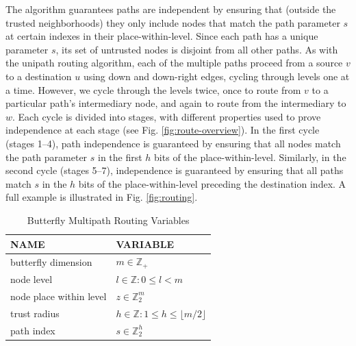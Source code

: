 \documentclass[10pt,letterpaper]{article}
\begin{document}
The algorithm guarantees paths are independent by ensuring that
(outside the trusted neighborhoods)
they only include
nodes that match the path parameter $s$ at certain indexes in their
place-within-level.
Since each path has a unique parameter $s$,
its set of untrusted nodes is disjoint from all other paths.
As with the unipath routing algorithm,
each of the multiple paths proceed from a source $v$ to a destination $u$
using down and down-right edges,
cycling through levels one at a time.
However, we cycle through the levels twice, once to route from $v$ to a
particular path's intermediary node,
and again to route from the intermediary to $w$.
Each cycle is divided into stages,
with different properties used to prove independence at each stage
(see Fig. \ref{fig:route-overview}).
In the first cycle (stages 1--4), path independence is guaranteed by ensuring that
all nodes match the path parameter $s$ in the first $h$ bits of the place-within-level.
Similarly, in the second cycle (stages 5--7),
independence is guaranteed by ensuring that all paths match $s$ in the
$h$ bits of the place-within-level preceding the destination index.
A full example is illustrated in Fig. \ref{fig:routing}.

\begin{table}[h!]
\caption{Butterfly Multipath Routing Variables\label{tab:routing}}
\begin{center}
\begin{tabular}{|l|l|}
\hline
NAME & VARIABLE \\\hline
butterfly dimension & $m \in \mathbb{Z}_+$ \\\hline
node level & $l \in \mathbb{Z} : 0 \leq l < m$ \\\hline
node place within level & $z \in \mathbb{Z}_2^m$ \\\hline
trust radius & $h \in \mathbb{Z} : 1 \leq h \leq \lfloor m/2 \rfloor$ \\\hline
path index & $s \in \mathbb{Z}_2^h$ \\\hline
\end{tabular}
\end{center}
\end{table}
\end{document}

